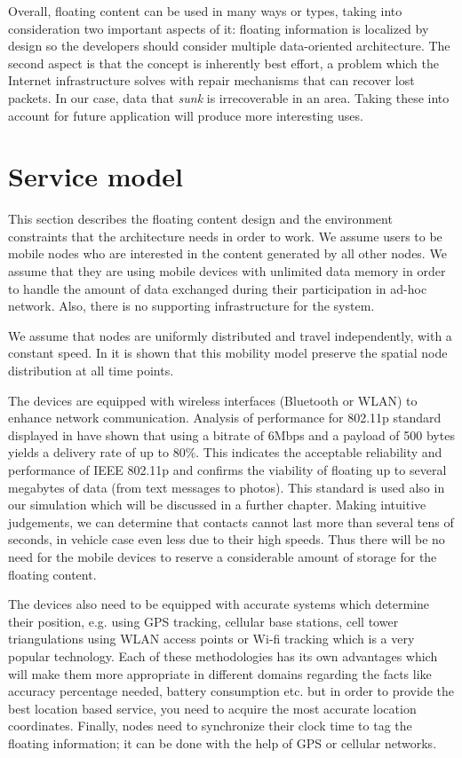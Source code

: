 Overall, floating content can be used in many ways or types, taking into
consideration two important aspects of it: floating information is localized by
design so the developers should consider multiple data-oriented architecture.
The second aspect is that the concept is inherently best effort, a problem which
the Internet infrastructure solves with repair mechanisms that can recover lost
packets. In our case, data that {\it sunk} is irrecoverable in an area. Taking
these into account for future application will produce more interesting uses.

\section{Service model}

This section describes the floating content design and the environment
constraints that the architecture needs in order to work.
We assume users to be mobile nodes who are interested in the content generated
by all other nodes. We assume that they are using mobile devices with unlimited
data memory in order to handle the amount of data exchanged during their
participation in ad-hoc network. Also, there is no supporting infrastructure for
the system.

We assume that nodes are uniformly distributed and travel independently, with a
constant speed. In \cite{uniform_distribution} it is shown that this mobility
model preserve the spatial node distribution at all time points.

The devices are equipped with wireless interfaces (Bluetooth or WLAN) to enhance
network communication. Analysis of performance for 802.11p standard displayed in
\cite {performance80211} have shown that using a bitrate of 6Mbps and a
payload of 500 bytes yields a delivery rate of up to 80\%. This indicates the acceptable
reliability and performance of IEEE 802.11p and confirms the viability of
floating up to several megabytes of data (from text messages to photos). This
standard is used also in our simulation which will be discussed in a further
chapter. Making intuitive judgements, we can determine that contacts cannot last
more than several tens of seconds, in vehicle case even less due to their high
speeds. Thus there will be no need for the mobile devices to reserve a
considerable amount of storage for the floating content.

The devices also need to be equipped with accurate systems which determine their
position, e.g. using GPS tracking, cellular base stations, cell tower
triangulations using WLAN access points or Wi-fi tracking which is a very
popular technology. Each of these methodologies has its own advantages which
will make them more appropriate in different domains regarding the facts like
accuracy percentage needed, battery consumption etc. but in order to provide the
best location based service, you need to acquire the most accurate location
coordinates. Finally, nodes need to synchronize their clock time to tag the
floating information; it can be done with the help of GPS or cellular networks.

